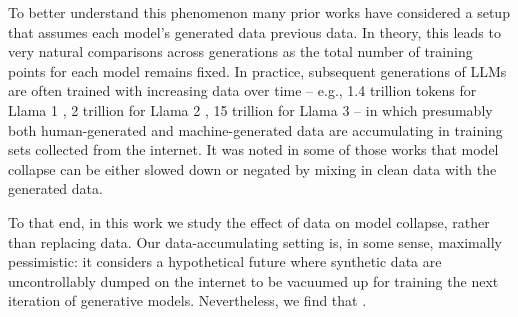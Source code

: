 To better understand this phenomenon
many prior works have considered a setup
that assumes each model's generated data \textit{} previous data.  %
In theory,
this leads to very natural comparisons across generations as the total number of training points for each model remains fixed.
In practice,
subsequent generations of LLMs are often trained with
increasing data over time -- e.g., 1.4 trillion tokens for Llama 1 \citep{touvron2023llama1}, 2 trillion for Llama 2 \citep{touvron2023llama2}, 15 trillion for Llama 3 -- 
in which presumably both 
human-generated and machine-generated data are accumulating in training sets collected from the internet. It was noted in some of those works \cite{hataya2023will, martinez2023combining, alemohammad2023self, bertrand2023stability, dohmatob2024tale} that model collapse can be either slowed down or negated by mixing in clean data with the generated data.


To that end, in this work we study the effect of \textit{} data on model collapse, rather than replacing data. Our data-accumulating setting is, in some sense, maximally pessimistic: it considers a hypothetical future where synthetic data are uncontrollably dumped on the internet to be vacuumed up for training the next iteration of generative models. Nevertheless, we find that \textit{}. 

